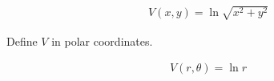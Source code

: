 \begin{align*}
    V(x, y) = \ln{\sqrt{x^2+y^2}}
\end{align*}

Define $V$ in polar coordinates.

\begin{solution}
\begin{align*}
    V(r, \theta) = \ln{r}
\end{align*}
\end{solution}